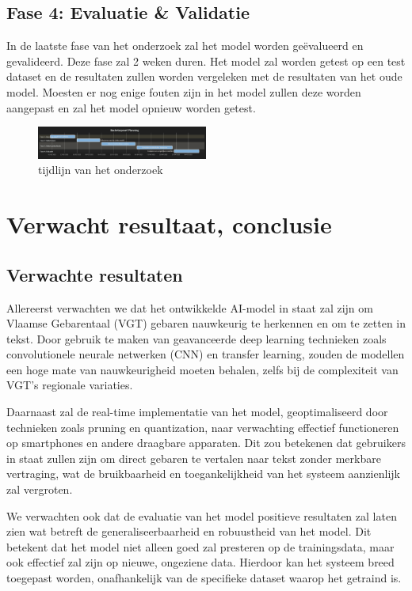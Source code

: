 \subsection{Fase 4: Evaluatie \& Validatie}
In de laatste fase van het onderzoek zal het model worden geëvalueerd en gevalideerd.
Deze fase zal 2 weken duren.
Het model zal worden getest op een test dataset en de resultaten zullen worden vergeleken met de resultaten van het oude model.
Moesten er nog enige fouten zijn in het model zullen deze worden aangepast en zal het model opnieuw worden getest.

\begin{figure}[h!]
  \includegraphics[width=0.5\textwidth]{../graphics/gantt_tijd.png}
  \caption{tijdlijn van het onderzoek}
  \label{fig:gantt_tijd}
\end{figure}

\section{Verwacht resultaat, conclusie}%
\label{sec:verwachte_resultaten}
\subsection{Verwachte resultaten} Allereerst verwachten we dat het ontwikkelde AI-model in staat zal zijn om Vlaamse Gebarentaal (VGT) gebaren nauwkeurig te herkennen en om te zetten in tekst. Door gebruik te maken van geavanceerde deep learning technieken zoals convolutionele neurale netwerken (CNN) en transfer learning, zouden de modellen een hoge mate van nauwkeurigheid moeten behalen, zelfs bij de complexiteit van VGT's regionale variaties.

Daarnaast zal de real-time implementatie van het model, geoptimaliseerd door technieken zoals pruning en quantization, naar verwachting effectief functioneren op smartphones en andere draagbare apparaten. Dit zou betekenen dat gebruikers in staat zullen zijn om direct gebaren te vertalen naar tekst zonder merkbare vertraging, wat de bruikbaarheid en toegankelijkheid van het systeem aanzienlijk zal vergroten.

We verwachten ook dat de evaluatie van het model positieve resultaten zal laten zien wat betreft de generaliseerbaarheid en robuustheid van het model. Dit betekent dat het model niet alleen goed zal presteren op de trainingsdata, maar ook effectief zal zijn op nieuwe, ongeziene data. Hierdoor kan het systeem breed toegepast worden, onafhankelijk van de specifieke dataset waarop het getraind is.

